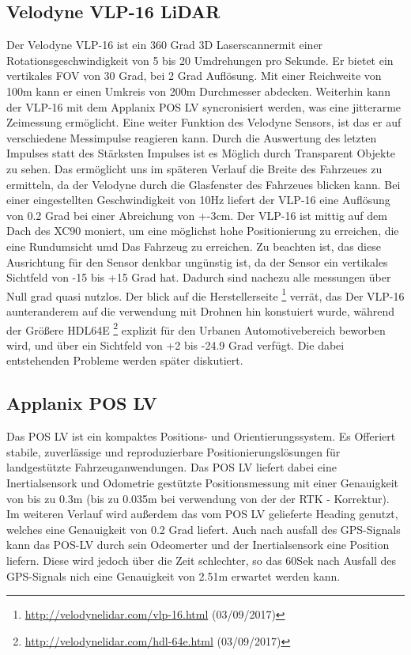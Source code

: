 \subsection{Velodyne VLP-16 LiDAR}
Der Velodyne VLP-16 ist ein 360 Grad 3D Laserscannermit einer Rotationsgeschwindigkeit von 5 bis 20 Umdrehungen pro Sekunde. Er bietet ein vertikales FOV von 30 Grad, bei 2 Grad Auflösung.
Mit einer Reichweite von 100m kann er einen Umkreis von 200m Durchmesser abdecken. Weiterhin kann der VLP-16 mit dem Applanix POS LV syncronisiert werden, was eine jitterarme Zeimessung ermöglicht.
Eine weiter Funktion des Velodyne Sensors, ist das er auf verschiedene Messimpulse reagieren kann. Durch die Auswertung des letzten Impulses statt des Stärksten Impulses ist es Möglich durch Transparent Objekte zu sehen.
Das ermöglicht uns im späteren Verlauf die Breite des Fahrzeues zu ermitteln, da der Velodyne durch die Glasfenster des Fahrzeues blicken kann.
Bei einer eingestellten Geschwindigkeit von 10Hz liefert der VLP-16 eine Auflösung von 0.2 Grad bei einer Abreichung von +-3cm. Der VLP-16 ist mittig auf dem Dach des XC90 moniert, um eine möglichst hohe Positionierung
zu erreichen, die eine Rundumsicht umd Das Fahrzeug zu erreichen. Zu beachten ist, das diese Ausrichtung für den Sensor denkbar ungünstig ist, da der Sensor ein vertikales
Sichtfeld von -15 bis +15 Grad hat. Dadurch sind nachezu alle messungen über Null grad quasi nutzlos. Der blick auf die Herstellerseite
\footnote{\url{http://velodynelidar.com/vlp-16.html} (03/09/2017)}
verrät, das Der VLP-16 aunteranderem auf die verwendung mit Drohnen hin konstuiert wurde, während der Größere HDL64E
\footnote{\url{http://velodynelidar.com/hdl-64e.html} (03/09/2017)}
explizit für den Urbanen Automotivebereich beworben wird, und über ein Sichtfeld von +2 bis -24.9 Grad verfügt. Die dabei entstehenden Probleme werden später diskutiert.



\subsection{Applanix POS LV}
Das POS LV ist ein kompaktes Positions- und Orientierungssystem. Es Offeriert stabile, zuverlässige und reproduzierbare Positionierungslösungen für landgestützte Fahrzeuganwendungen.
Das POS LV liefert dabei eine Inertialsensork und Odometrie gestützte Positionsmessung mit einer Genauigkeit von bis zu 0.3m (bis zu 0.035m bei verwendung von der der RTK - Korrektur).
Im weiteren Verlauf wird außerdem das vom POS LV gelieferte Heading genutzt, welches eine Genauigkeit von 0.2 Grad liefert. Auch nach ausfall des GPS-Signals kann das POS-LV durch sein
Odeomerter und der Inertialsensork eine Position liefern. Diese wird jedoch über die Zeit schlechter, so das 60Sek nach Ausfall des GPS-Signals nich eine Genauigkeit von 2.51m erwartet
werden kann.\cite{manAP}






